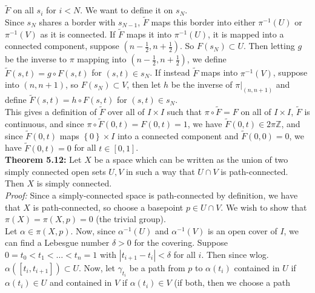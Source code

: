 \documentclass[a4paper]{article}
\begin{document}
     $\tilde{F}$ on all $s_i$ for $i < N$. We want to define it on $s_N$.\\
     Since  $s_N$ shares a border with $s_{N-1}$, $\tilde{F}$ maps this border
     into either $\pi^{-1}(U)$ or $\pi^{-1}(V)$ as it is connected. If
     $\tilde{F}$ maps it into $\pi^{-1}(U)$, it is mapped into a connected
     component, suppose $(n-\frac{1}{2}, n+\frac{1}{2})$. So
     $F(s_{N}) \subset U$. Then
     letting $g$ be the inverse to $\pi$ mapping into $(n-\frac{1}{2},
     n+\frac{1}{2})$, we define
     $\tilde{F}(s,t) = g\circ F(s,t)$ for
     $(s,t) \in s_N$. If instead
     $\tilde{F}$ maps into $\pi^{-1}(V)$, suppose into
     $(n, n+1)$, so $F(s_{N}) \subset V$, then let $h$ be the inverse of
     $\pi|_{(n,n+1)}$ and define
     $\tilde{F}(s,t) = h \circ F(s,t)$ for $(s,t) \in s_{N}$.\\
     This gives a definition of $\tilde{F}$ over all of $I \times I$ such that
     $\pi \circ \tilde{F} = F$ on all of $I \times I$, $\tilde{F}$ is
     continuous, and
     since $\pi \circ \tilde{F}(0,t) = F(0,t) = 1$, we have
     $\tilde{F}(0,t) \in 2 \pi \mathbb{Z}$, and since
     $\tilde{F}(0,t)$ maps $\left\{ 0 \right\} \times I$ into a connected
     component and $\tilde{F}(0,0) = 0$, we have
     $\tilde{F}(0,t) = 0$ for all $t \in \left[ 0,1 \right] $.\\
     \linebreak
     \textbf{Theorem 5.12:} Let $X$ be a space which can be written as the
     union of two simply connected open sets $U,V$ in such a way that $U \cap
     V$ is
     path-connected. Then $X$ is simply connected.\\
     \linebreak
     \textit{Proof:} Since a simply-connected space is path-connected by
     definition, we have that $X$ is path-connected, so
     choose a basepoint $p \in U \cap V$. We wish to show that
     $\pi(X) = \pi(X,p) = 0$ (the trivial group).\\
     Let $\alpha \in \pi(X,p)$. Now, since
     $\alpha^{-1}(U)$ and $\alpha^{-1}(V)$ is an open cover of $I$, we can find
     a Lebesgue number $\delta >0$ for the covering. Suppose
     $0 = t_0 < t_1 < \ldots < t_n = 1$ with $\left| t_{i+1} - t_i \right|
     < \delta$ for all $i$. Then since wlog.
     $\alpha \left( \left[ t_{i}, t_{i+1} \right]  \right) 
     \subset U$. Now, let $\gamma_{t_i}$ be a path from
      $p$ to  $\alpha (t_i)$ contained in $U$ if $\alpha(t_i) \in U$ and
      contained in $V$ if $\alpha(t_i) \in V$ (if both, then we choose a path
\end{document}
